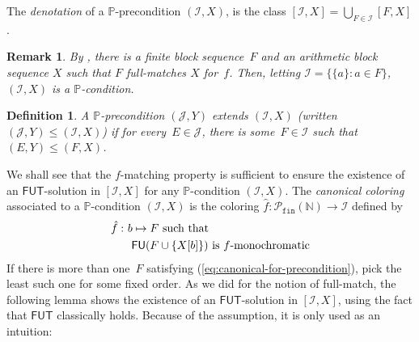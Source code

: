 \documentclass[10pt,a4paper]{article}
\def\PP{\mathbb{P}}
\def\J{\mathcal{J}}
\def\I{\mathcal{I}}
\newcommand{\FUT}[0]{\mathsf{FUT}}
\newcommand{\NN}[0]{\mathbb{N}}
\newcommand{\Pfin}{\mathcal{P}_{\mathtt{fin}}}
\newcommand{\FU}[0]{\mathsf{FU}} %
\numberwithin{theorem}{section}
\newtheorem{remark}[theorem]{Remark}
\newtheorem{definition}[theorem]{Definition}
\begin{document}
The \emph{denotation} of a $\PP$-precondition $(\I, X)$, is the class $[\I, X] = \bigcup_{F \in \I} [F, X]$.


\begin{remark}
By , there is a finite block sequence~$F$ and an arithmetic block sequence $X$
such that $F$ full-matches $X$ for~$f$.
Then, letting $\I = \{ \{a\} : a \in F \}$, $(\I, X)$ is a $\PP$-condition.
\end{remark}

\begin{definition}
A $\PP$-precondition $(\J, Y)$ \emph{extends} $(\I, X)$ (written $(\J, Y) \leq (\I, X)$) if for every~$E \in \J$, there is some~$F \in \I$ such that $(E, Y) \leq (F, X)$. 
\end{definition}

We shall see that the $f$-matching property is sufficient to ensure the existence of an $\FUT$-solution in $[\I, X]$ for any $\PP$-condition $(\I, X)$.
The \emph{canonical coloring} associated to a $\PP$-condition $(\I, X)$ is the coloring $\hat f : \Pfin(\NN) \to \I$ defined by
\begin{align}\label{eq:canonical-for-precondition}
\hat f :\ & b \mapsto F \text{ such that } \notag \\
 & \text{ $\FU(F \cup \{X[b]\})$ is $f$-monochromatic}
\end{align}
If there is more than one~$F$ satisfying (\ref{eq:canonical-for-precondition}), pick the least such one for some fixed order.
As we did for the notion of full-match, the following lemma shows the existence of an $\FUT$-solution in $[\I, X]$, using the fact that $\FUT$ classically holds. Because of the assumption, it is only used as an intuition:
\end{document}
